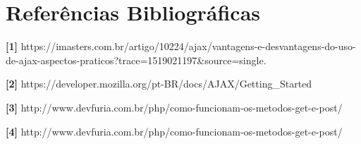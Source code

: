 \documentclass[12pt,a4paper]{article}
\begin{document}
\section{Referências Bibliográficas}

\noindent \textbf{[1]} {https://imasters.com.br/artigo/10224/ajax/vantagens-e-desvantagens-do-uso-de-ajax-aspectos-praticos?trace=1519021197\&source=single.}\\\vspace{0.2cm}

\noindent \textbf{[2]} {https://developer.mozilla.org/pt-BR/docs/AJAX/Getting\_Started}\\\vspace{0.2cm}

\noindent \textbf{[3]} {http://www.devfuria.com.br/php/como-funcionam-os-metodos-get-e-post/}\\\vspace{0.2cm}




\noindent \textbf{[4]} {http://www.devfuria.com.br/php/como-funcionam-os-metodos-get-e-post/}\\\vspace{0.2cm}
\end{document}
